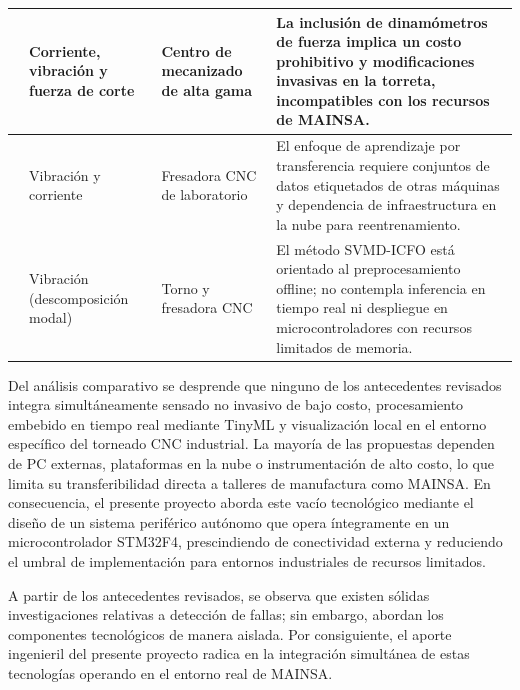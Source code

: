 {\begin{longtable}{|>{\raggedright\arraybackslash}p{3.0cm}|>{\raggedright\arraybackslash}p{2.6cm}|>{\raggedright\arraybackslash}p{2.6cm}|>{\raggedright\arraybackslash}p{4.4cm}|}
\cite{wang2024} & Corriente, vibración y fuerza de corte & Centro de mecanizado de alta gama & La inclusión de dinamómetros de fuerza implica un costo prohibitivo y modificaciones invasivas en la torreta, incompatibles con los recursos de MAINSA. \\ \hline

\cite{huang2026} & Vibración y corriente & Fresadora CNC de laboratorio & El enfoque de aprendizaje por transferencia requiere conjuntos de datos etiquetados de otras máquinas y dependencia de infraestructura en la nube para reentrenamiento. \\ \hline

\cite{jia2025} & Vibración (descomposición modal) & Torno y fresadora CNC & El método SVMD-ICFO está orientado al preprocesamiento offline; no contempla inferencia en tiempo real ni despliegue en microcontroladores con recursos limitados de memoria. \\ \hline

\end{longtable}
}

Del análisis comparativo se desprende que ninguno de los antecedentes revisados integra simultáneamente sensado no invasivo de bajo costo, procesamiento embebido en tiempo real mediante TinyML y visualización local en el entorno específico del torneado CNC industrial. La mayoría de las propuestas dependen de PC externas, plataformas en la nube o instrumentación de alto costo, lo que limita su transferibilidad directa a talleres de manufactura como MAINSA. En consecuencia, el presente proyecto aborda este vacío tecnológico mediante el diseño de un sistema periférico autónomo que opera íntegramente en un microcontrolador STM32F4, prescindiendo de conectividad externa y reduciendo el umbral de implementación para entornos industriales de recursos limitados.

A partir de los antecedentes revisados, se observa que existen sólidas investigaciones relativas a detección de fallas; sin embargo, abordan los componentes tecnológicos de manera aislada. Por consiguiente, el aporte ingenieril del presente proyecto radica en la integración simultánea de estas tecnologías operando en el entorno real de MAINSA.
